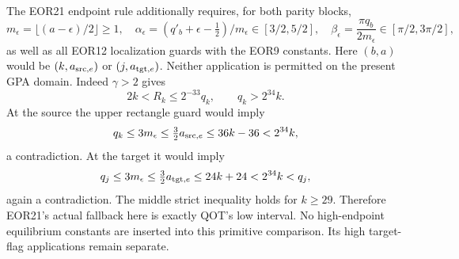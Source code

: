 \documentclass[11pt,a4paper]{article}
\begin{document}
The EOR21 endpoint rule additionally requires, for both parity blocks,
\[
 m_\epsilon=\lfloor(a-\epsilon)/2\rfloor\ge1,\quad
 \alpha_\epsilon=(q'_b+\epsilon-\tfrac12)/m_\epsilon
       \in[3/2,5/2],\quad
 \beta_\epsilon=\frac{\pi q_b}{2m_\epsilon}\in[\pi/2,3\pi/2],
\]
as well as all EOR12 localization guards with the EOR9 constants.
Here $(b,a)$ would be $(k,a_{{\rm src},e})$ or
$(j,a_{{\rm tgt},e})$. Neither application is permitted on the present
GPA domain. Indeed $\gamma>2$ gives
\[
 2k<R_k\le2^{-33}q_k,\qquad q_k>2^{34}k .
\]
At the source the upper rectangle guard would imply
\[
 q_k\le3m_\epsilon\le\tfrac32a_{{\rm src},e}
       \le36k-36<2^{34}k,
\]
a contradiction. At the target it would imply
\[
 q_j\le3m_\epsilon\le\tfrac32a_{{\rm tgt},e}
       \le24k+24<2^{34}k<q_j,
\]
again a contradiction. The middle strict inequality holds for $k\ge29$.
Therefore EOR21's actual fallback here is exactly QOT's low interval.
No high-endpoint equilibrium constants are inserted into this primitive
comparison. Its high target-flag applications remain separate.
\end{document}

